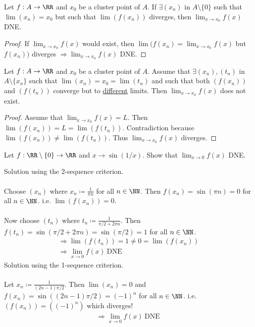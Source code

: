 \documentclass[class=scrartcl, crop=false]{standalone}
\begin{document}
\begin{theorem}
  Let $f: A \to \RR$ and $x_0$ be a cluster point of $A$. If $\exists (x_n)$ in $A \setminus \{0\}$ such that $\lim(x_n) = x_0$ but such that $\lim(f(x_n))$ diverges, then $\lim_{x \to x_0}f(x)$ DNE.
  \begin{proof}
    If $\lim_{x \to x_0}f(x)$ would exist, then $\lim(f(x_n) = \lim_{x \to x_0}f(x)$ but $f(x_n))$ diverges $\Rightarrow \lim_{x \to x_0} f(x)$ DNE.
  \end{proof} 
\end{theorem} 

\begin{theorem}
  Let $f: A \to \RR$ and $x_0$ be a cluster point of $A$. Assume that $\exists (x_n), (t_n)$ in $A \setminus \{x_n\}$ such that $\lim(x_n) = x_0 = \lim(t_n)$ and such that both $(f(x_n))$ and $(f(t_n))$ converge but to \ul{different} limits. Then $\lim_{x \to x_0} f(x)$ does not exist.
  \begin{proof}
    Assume that $\lim_{x \to x_0}f(x) = L$. Then $\lim(f(x_n)) = L = \lim(f(t_n))$. Contradiction because $\lim(f(x_n)) \neq \lim(f(t_n))$. Thus $\lim_{x \to x_0}f(x)$ diverges.
  \end{proof} 
\end{theorem} 

\begin{example}
  Let $f: \RR \setminus \{0\} \to \RR$ and $x \to \sin(1 / x)$. Show that $\lim_{x \to 0} f(x)$ DNE.
  \begin{enumerate}
    \ii Solution using the 2-sequence criterion.
    \\\\
    Choose  $(x_n)$ where $x_n \coloneqq \frac{1}{\pi n}$ for all $n \in \NN$. Then $f(x_n) = \sin(\pi n) = 0$ for all $n \in \NN$. i.e. $\lim(f(x_n)) = 0$.
    \\\\
    Now choose $(t_n)$ where $t_n \coloneqq \frac{1}{\pi / 2 + 2\pi n}$. Then $f(t_n) = \sin(\pi / 2 + 2 \pi n) = \sin(\pi / 2) = 1$ for all $n \in \NN$.
    \begin{gather*}
      \Rightarrow \lim(f(t_n)) = 1 \neq 0 = \lim(f(x_n)) \\
      \Rightarrow \lim_{x \to 0} f(x) \ \text{DNE} \ 
    \end{gather*} 
    \ii Solution using the 1-sequence criterion.
    \\\\
    Let $x_n \coloneqq \frac{1}{(2n - 1) \pi / 2}$. Then $\lim(x_n) = 0$ and $f(x_n) = \sin((2n - 1) \pi / 2) = (-1)^n$ for all $n \in \NN$. i.e. $(f(x_n)) = ((-1)^n)$ which diverges!
    \begin{gather*}
      \Rightarrow \lim_{x \to 0} f(x) \ \text{DNE} \ 
    \end{gather*} 
  \end{enumerate} 
\end{example} 
\end{document}
